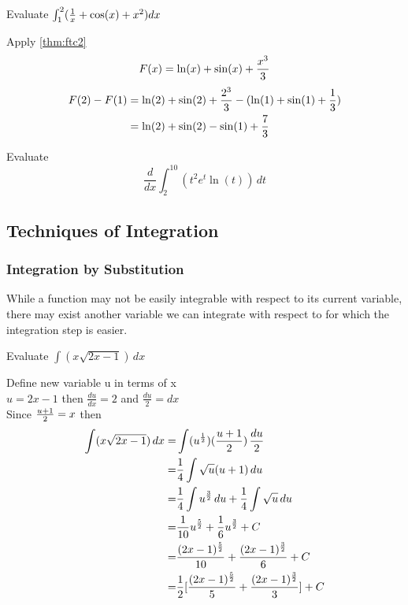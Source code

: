 \documentclass[english, 12pt]{article}
\begin{document}
\begin{exmp}
Evaluate $\int_1^2 (\frac{1}{x} + \cos(x) + x^2) dx$
\end{exmp}
\begin{sol}
Apply \ref{thm:ftc2}
\[F(x)=\ln(x) + \sin(x) + \frac{x^3}{3}\]
\begin{align*}
F(2) - F(1) & = \ln (2) + \sin (2) + \frac{2^3}{3}-(\ln(1)+\sin(1)+\frac{1}{3})\\
& = \ln(2)+\sin(2) - \sin(1) + \frac{7}{3} 
\end{align*}
\end{sol}

\begin{exercise}
Evaluate \[\frac{d}{dx} \int_2^{10} (t^2 e^t \ln(t)) \,dt \]
\end{exercise}

\subsection{Techniques of Integration}
\subsubsection{Integration by Substitution}

While a function may not be easily integrable with respect to its current variable, there may exist another variable we can integrate with respect to for which the integration step is easier.

\begin{exmp}
Evaluate $\int (x \sqrt{2x-1})\,dx $
\begin{sol}
Define new variable u in terms of x\\
$u=2x-1$ then $\frac{du}{dx}=2$ and $\frac{du}{2}=dx$\\
Since $\frac{u+1}{2}=x$ then 
\begin{align*}
\int (x \sqrt{2x-1})\,dx = & \int (u^\frac 1 2 )(\frac{u+1}{2}) \,\frac{du}{2}\\
= & \frac 1 4 \int \sqrt{u} (u+1)\,du\\
= & \frac 1 4 \int u^\frac 3 2\,du + \frac 1 4 \int \sqrt{u}\,du\\
= & \frac{1}{10} u^\frac 5 2 + \frac{1}{6} u^\frac 3 2 + C\\
= & \frac{(2x-1)^\frac 5 2}{10}  + \frac{(2x-1)^\frac 3 2}{6} + C\\
= & \frac{1}{2} [\frac{(2x-1)^\frac 5 2}{5}  + \frac{(2x-1)^\frac 3 2}{3}] + C\\
\end{align*}
\end{sol}
\end{exmp}
\end{document}
